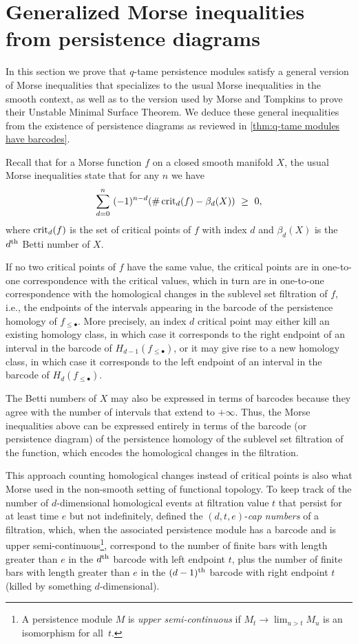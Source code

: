 
\section{Generalized Morse inequalities from persistence diagrams} \label{s:inequalities}

In this section we prove that $q$-tame persistence modules satisfy a general version of Morse inequalities that specializes to the usual Morse inequalities in the smooth context, as well as to the version used by Morse and Tompkins to prove their Unstable Minimal Surface Theorem.
We deduce these general inequalities from the existence of persistence diagrams as reviewed in \cref{thm:q-tame modules have barcodes}.

Recall that for a Morse function $f$ on a closed smooth manifold $X$, the usual Morse inequalities state that for any $n$ we have
\begin{equation} \label{equ:morse_inequalities}
\sum_{d=0}^n \ (-1)^{n-d} ( \# \crit_{d}(f) - \beta_{d}(X) ) \ \geq\  0,  
\end{equation}
where $\operatorname{crit}_{d}(f)$ is the set of critical points of $f$ with index $d$ and $\beta_{d}(X)$ is the $d^{\mathrm{th}}$ Betti number of $X$.

If no two critical points of $f$ have the same value, the critical points are in one-to-one correspondence with the critical values, which in turn are in one-to-one correspondence with the homological changes in the sublevel set filtration of $f$, i.e., the endpoints of the intervals appearing in the barcode of the persistence homology of $f_{\leq \bullet}$.
More precisely, an index $d$ critical point may either kill an existing homology class, in which case it corresponds to the right endpoint of an interval in the barcode of $H_{d-1}(f_{\leq \bullet})$, or it may give rise to a new homology class, in which case it corresponds to the left endpoint of an interval in the barcode of $H_d(f_{\leq \bullet})$.

The Betti numbers of $X$ may also be expressed in terms of barcodes because they agree with the number of intervals that extend to $+\infty$.
Thus, the Morse inequalities above can be expressed entirely in terms of the barcode (or persistence diagram) of the persistence homology of the sublevel set filtration of the function, which encodes the homological changes in the filtration.

This approach counting homological changes instead of critical points is also what Morse used in the non-smooth setting of functional topology.
To keep track of the number of $d$-dimensional homological events at filtration value $t$ that persist for at least time $e$ but not indefinitely, \citet{Morse.1940} defined the $(d, t, e)$-\textit{cap numbers} of a filtration, which, when the associated persistence module has a barcode and is upper semi-continuous\footnote{A persistence module $M$ is \emph{upper semi-continuous} if $M_{t} \to \lim_{u > t} M_{u}$ is an isomorphism for all~$t$.}, correspond to the number of finite bars with length greater than $e$ in the $d^{\mathrm{th}}$ barcode with left endpoint $t$, plus the number of finite bars with length greater than $e$ in the $(d-1)^{\mathrm{th}}$ barcode with right endpoint $t$ (killed by something $d$-dimensional).

